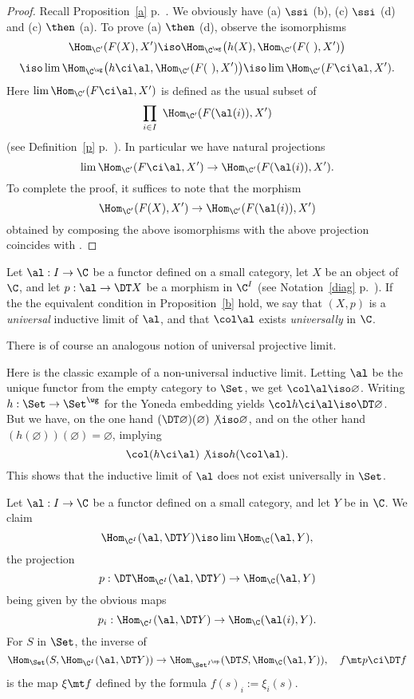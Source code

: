 \documentclass[12pt]{article}
\theoremstyle{remark}
\theoremstyle{definition}
\begin{document}
\begin{s}
\begin{proof}
Recall Proposition~\ref{a} p.~. We obviously have (a) $\ssi$ (b), (c) $\ssi$ (d) and (c) $\then$ (a). To prove (a) $\then$ (d), observe the isomorphisms
$$
\Hom_{\C'}(F(X),X')\iso\Hom_{\C^\wg}\big(h(X),\Hom_{\C'}(F(\ ),X')\big)
$$
$$
\iso\lim\Hom_{\C^\wg}\big(h\ci\al,\Hom_{\C'}(F(\ ),X')\big)\iso\lim\Hom_{\C'}(F\ci\al,X').
$$ 
Here $\lim\Hom_{\C'}(F\ci\al,X')$ is defined as the usual subset of 
$$
\prod_{i\in I}\ \Hom_{\C'}(F(\al(i)),X')
$$ 
(see Definition~\ref{p} p.~). In particular we have natural projections 
$$
\lim\Hom_{\C'}(F\ci\al,X')\to\Hom_{\C'}(F(\al(i)),X').
$$ 
To complete the proof, it suffices to note that the morphism 
$$
\Hom_{\C'}(F(X),X')\to\Hom_{\C'}(F(\al(i)),X')
$$ 
obtained by composing the above isomorphisms with the above projection coincides with .
\end{proof}
\begin{df} 
Let $\al:I\to\C$ be a functor defined on a small category, let $X$ be an object of $\C$, and let $p:\al\to\DT X$ be a morphism in $\C^I$ (see Notation~\ref{diag} p.~). If the the equivalent condition in Proposition~\ref{b} hold, we say that $(X,p)$ is a {\em universal} inductive limit of $\al$, and that $\col\al$ exists {\em universally} in $\C$.
\end{df}

There is of course an analogous notion of universal projective limit. 

Here is the classic example of a non-universal inductive limit. Letting $\al$ be the unique functor from the empty category to $\Set$, we get $\col\al\iso\varnothing$. Writing $h:\Set\to\Set^\wg$ for the Yoneda embedding yields $\col h\ci\al\iso\DT\varnothing$. But we have, on the one hand $(\DT\varnothing)(\varnothing)\not\iso\varnothing$, and on the other hand $(h(\varnothing))(\varnothing)=\varnothing$, implying 
$$
\col(h\ci\al)\not\iso h(\col\al).
$$ 
This shows that the inductive limit of $\al$ does not exist universally in $\Set$.
\end{s}

%

\begin{s}%
Let $\al:I\to\C$ be a functor defined on a small category, and let $Y$ be in $\C$. We claim 
$$%
\Hom_{\C^I}(\al,\DT Y)\iso\lim\Hom_\C(\al,Y),
$$%
the projection 
$$
p:\DT\Hom_{\C^I}(\al,\DT Y)\to\Hom_\C(\al,Y)
$$ 
being given by the obvious maps 
$$
p_i:\Hom_{\C^I}(\al,\DT Y)\to\Hom_\C(\al(i),Y).
$$ 
For $S$ in $\Set$, the inverse of 
$$
\Hom_\Set(S,\Hom_{\C^I}(\al,\DT Y))\to\Hom_{\Set^{I^{\op}}}(\DT S,\Hom_\C(\al,Y)),\quad f\mt p\ci\DT f
$$ 
is the map $\xi\mt f$ defined by the formula $f(s)_i:=\xi_i(s)$.
\end{s}
\end{document}
